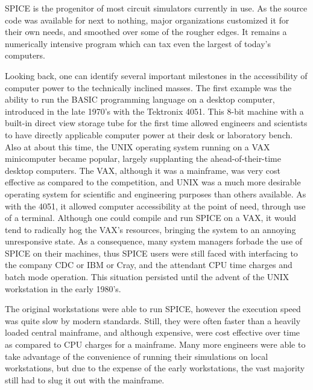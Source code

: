 SPICE is the progenitor of most circuit simulators currently in use.
As the source code was available for next to nothing, major
organizations customized it for their own needs, and smoothed over
some of the rougher edges.  It remains a numerically intensive program
which can tax even the largest of today's computers.

Looking back, one can identify several important milestones in the
accessibility of computer power to the technically inclined masses. 
The first example was the ability to run the BASIC programming
language on a desktop computer, introduced in the late 1970's with the
Tektronix 4051.  This 8-bit machine with a built-in direct view
storage tube for the first time allowed engineers and scientists to
have directly applicable computer power at their desk or laboratory
bench.  Also at about this time, the UNIX operating system running on
a VAX minicomputer became popular, largely supplanting the
ahead-of-their-time desktop computers.  The VAX, although it was a
mainframe, was very cost effective as compared to the competition, and
UNIX was a much more desirable operating system for scientific and
engineering purposes than others available.  As with the 4051, it
allowed computer accessibility at the point of need, through use of a
terminal.  Although one could compile and run SPICE on a VAX, it would
tend to radically hog the VAX's resources, bringing the system to an
annoying unresponsive state.  As a consequence, many system managers
forbade the use of SPICE on their machines, thus SPICE users were
still faced with interfacing to the company CDC or IBM or Cray, and
the attendant CPU time charges and batch mode operation.  This
situation persisted until the advent of the UNIX workstation in the
early 1980's.

The original workstations were able to run SPICE, however the
execution speed was quite slow by modern standards.  Still, they were
often faster than a heavily loaded central mainframe, and although
expensive, were cost effective over time as compared to CPU charges
for a mainframe.  Many more engineers were able to take advantage of
the convenience of running their simulations on local workstations,
but due to the expense of the early workstations, the vast majority
still had to slug it out with the mainframe.

